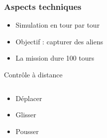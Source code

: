 \documentclass{beamer}
\begin{document}
\begin{frame}
    \frametitle{Aspects techniques}
    \begin{itemize}
        \item Simulation en tour par tour
        \item Objectif : capturer des aliens
        \item La mission dure 100 tours
    \end{itemize}
\end{frame}

\begin{frame}{Contrôle à distance}
    \begin{columns}[T]
    \begin{column}{0.3\textwidth}
        \begin{itemize}
            \item<1-> Déplacer
            \item<2-> Glisser
            \item<3-> Pousser
        \end{itemize}
    \end{column}
    \begin{column}{0.7\textwidth}
        \centering
\end{column}
\end{columns}
\end{frame}
\end{document}
